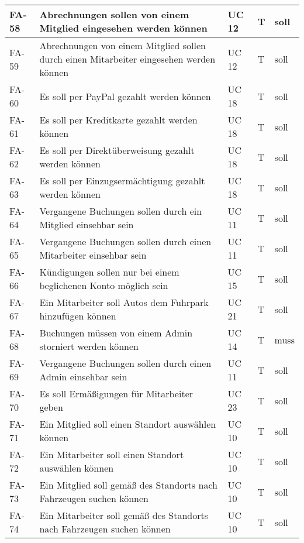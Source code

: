 \begin{longtable}{|m{1.5cm}|m{5.5cm}|P{3cm}|P{2cm}|P{1cm}|}
        \hline
        FA-58           & Abrechnungen sollen von einem Mitglied eingesehen werden können & UC 12 & T & soll\\
        \hline
        FA-59           & Abrechnungen von einem Mitglied sollen durch einen Mitarbeiter eingesehen werden können & UC 12 & T & soll\\
        \hline
        FA-60           & Es soll per PayPal gezahlt werden können & UC 18 & T & soll\\
        \hline
        FA-61           & Es soll per Kreditkarte gezahlt werden können & UC 18 & T & soll\\
        \hline
        FA-62           & Es soll per Direktüberweisung gezahlt werden können & UC 18 & T & soll\\
        \hline
        FA-63           & Es soll per Einzugsermächtigung gezahlt werden können & UC 18 & T & soll\\
        \hline
        FA-64           & Vergangene Buchungen sollen durch ein Mitglied einsehbar sein & UC 11 & T & soll\\
        \hline
        FA-65           & Vergangene Buchungen sollen durch einen Mitarbeiter einsehbar sein & UC 11 & T & soll\\
        \hline
        FA-66           & Kündigungen sollen nur bei einem beglichenen Konto möglich sein & UC 15 & T & soll\\
        \hline
        FA-67           & Ein Mitarbeiter soll Autos dem Fuhrpark hinzufügen können & UC 21 & T & soll\\
        \hline
        FA-68           & Buchungen müssen von einem Admin storniert werden können & UC 14 & T & muss \\
        \hline
        FA-69           & Vergangene Buchungen sollen durch einen Admin einsehbar sein & UC 11 & T & soll\\
        \hline
        FA-70           & Es soll Ermäßigungen für Mitarbeiter geben & UC 23 & T & soll \\
        \hline
        FA-71           & Ein Mitglied soll einen Standort auswählen können & UC 10 & T & soll \\
        \hline
        FA-72           & Ein Mitarbeiter soll einen Standort auswählen können & UC 10 & T & soll \\
        \hline
        FA-73           & Ein Mitglied soll gemäß des Standorts nach Fahrzeugen suchen können & UC 10 & T & soll \\
        \hline
        FA-74           & Ein Mitarbeiter soll gemäß des Standorts nach Fahrzeugen suchen können & UC 10 & T & soll \\

\end{longtable}
